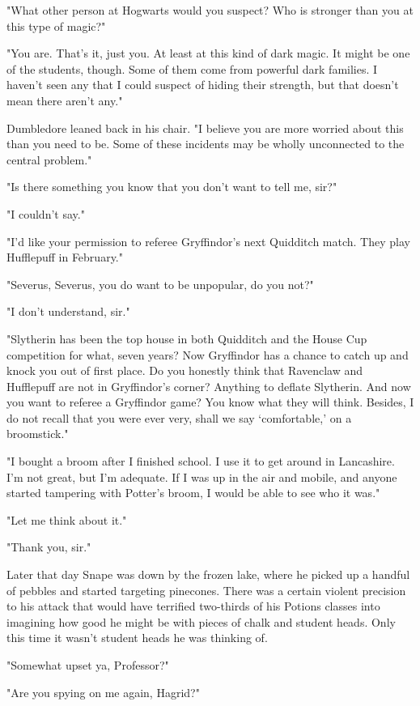 "What other person at Hogwarts would you suspect? Who is stronger than you at this type of magic?"

"You are. That's it, just you. At least at this kind of dark magic. It might be one of the students, though. Some of them come from powerful dark families. I haven't seen any that I could suspect of hiding their strength, but that doesn't mean there aren't any."

Dumbledore leaned back in his chair. "I believe you are more worried about this than you need to be. Some of these incidents may be wholly unconnected to the central problem."

"Is there something you know that you don't want to tell me, sir?"

"I couldn't say."

"I'd like your permission to referee Gryffindor's next Quidditch match. They play Hufflepuff in February."

"Severus, Severus, you do want to be unpopular, do you not?"

"I don't understand, sir."

"Slytherin has been the top house in both Quidditch and the House Cup competition for what, seven years? Now Gryffindor has a chance to catch up and knock you out of first place. Do you honestly think that Ravenclaw and Hufflepuff are not in Gryffindor's corner? Anything to deflate Slytherin. And now you want to referee a Gryffindor game? You know what they will think. Besides, I do not recall that you were ever very, shall we say `comfortable,' on a broomstick."

"I bought a broom after I finished school. I use it to get around in Lancashire. I'm not great, but I'm adequate. If I was up in the air and mobile, and anyone started tampering with Potter's broom, I would be able to see who it was."

"Let me think about it."

"Thank you, sir."

Later that day Snape was down by the frozen lake, where he picked up a handful of pebbles and started targeting pinecones. There was a certain violent precision to his attack that would have terrified two-thirds of his Potions classes into imagining how good he might be with pieces of chalk and student heads. Only this time it wasn't student heads he was thinking of.

"Somewhat upset ya, Professor?"

"Are you spying on me again, Hagrid?"

